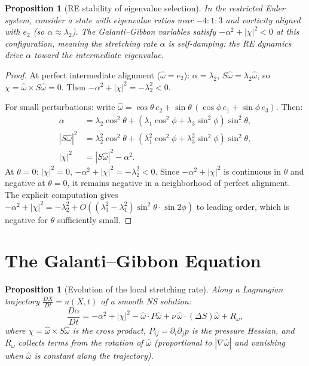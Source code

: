 \documentclass[11pt,a4paper]{article}
\theoremstyle{plain}
\newtheorem{proposition}[theorem]{Proposition}
\theoremstyle{definition}
\theoremstyle{remark}
\begin{document}
\begin{proposition}[RE stability of eigenvalue
selection]
\label{prop:RE-stability}
In the restricted Euler system, consider a state
with eigenvalue ratios near $-4:1:3$ and
vorticity aligned with $e_2$ (so
$\alpha\approx\lambda_2$).  The Galanti--Gibbon
variables satisfy $-\alpha^2+|\chi|^2 < 0$ at this
configuration, meaning the stretching rate $\alpha$
is self-damping: the RE dynamics drive $\alpha$
toward the intermediate eigenvalue.
\end{proposition}

\begin{proof}
At perfect intermediate alignment
($\hat\omega = e_2$): $\alpha = \lambda_2$,
$S\hat\omega = \lambda_2\hat\omega$, so
$\chi = \hat\omega\times S\hat\omega = 0$.
Then $-\alpha^2+|\chi|^2 = -\lambda_2^2 < 0$.

For small perturbations: write
$\hat\omega = \cos\theta\,e_2
+ \sin\theta\,(\cos\phi\,e_1+\sin\phi\,e_3)$.
Then:
\begin{align}
\alpha &= \lambda_2\cos^2\theta
+ (\lambda_1\cos^2\phi+\lambda_3\sin^2\phi)
\sin^2\theta, \\
|S\hat\omega|^2 &= \lambda_2^2\cos^2\theta
+ (\lambda_1^2\cos^2\phi+\lambda_3^2\sin^2\phi)
\sin^2\theta, \\
|\chi|^2 &= |S\hat\omega|^2 - \alpha^2.
\end{align}
At $\theta=0$: $|\chi|^2=0$,
$-\alpha^2+|\chi|^2 = -\lambda_2^2<0$.
Since $-\alpha^2+|\chi|^2$ is continuous in $\theta$
and negative at $\theta=0$, it remains negative in
a neighborhood of perfect alignment.
The explicit computation gives
$-\alpha^2+|\chi|^2 =
-\lambda_2^2+O((\lambda_3^2-\lambda_1^2)\sin^2\theta
\cdot\sin 2\phi)$ to leading order,
which is negative for $\theta$ sufficiently small.
\end{proof}


\section{The Galanti--Gibbon Equation}\label{sec:GG}

\begin{proposition}[Evolution of the local
stretching rate]
\label{prop:alpha-evolution}
Along a Lagrangian trajectory
$\frac{DX}{Dt}=u(X,t)$ of a smooth NS solution:
\begin{equation}\label{eq:alpha-evol}
\frac{D\alpha}{Dt} = -\alpha^2 + |\chi|^2
- \hat\omega\cdot P\hat\omega
+ \nu\,\hat\omega\cdot(\Delta S)\hat\omega
+ R_\omega,
\end{equation}
where $\chi = \hat\omega\times S\hat\omega$ is the
cross product, $P_{ij}=\partial_i\partial_j p$ is the
pressure Hessian, and $R_\omega$ collects terms
from the rotation of $\hat\omega$
(proportional to $|\nabla\hat\omega|$ and vanishing
when $\hat\omega$ is constant along the trajectory).
\end{proposition}
\end{document}
